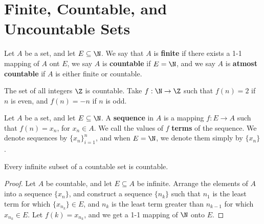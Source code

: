 
\section{Finite, Countable, and Uncountable Sets}

\begin{definition}
    Let $A$ be a set, and let  $E \subseteq \N$. We say that  $A$ is \textbf{finite} if there
    exists a 1-1 mapping of $A$ ont $E$, we say $A$ is \textbf{countable} if  $E=\N$, and
    we say  $A$ is \textbf{atmost countable} if $A$ is either finite or countable.
\end{definition}

\begin{example}
    The set of all integers $\Z$ is countable. Take  $f:\N \rightarrow \Z$ such that
    $f(n)=2$ if  $n$ is even, and  $f(n)=-n$ if  $n$ is odd.
\end{example}

\begin{definition}
    Let $A$ be a set, and let  $E \subseteq \N$. A \textbf{sequence} in  $A$ is a mapping
    $f:E \rightarrow A$ such that $f(n)=x_n$, for  $x_n \in A$. We call the values of  $f$
    \textbf{terms} of the sequence. We denote sequences by  $\{x_n\}_{i=1}^{n}$, and
    when  $E=\N$, we denote them simply by  $\{x_n\}$.
\end{definition}

\begin{theorem}\label{2.1.1}
    Every infinite subset of a countable set is countable.
\end{theorem}
\begin{proof}
    Let $A$ be countable, and let  $E \subseteq A$ be infinite. Arrange the elements of  $A$
    into a sequence $\{x_n\}$, and construct a sequence  $\{n_k\}$ such that  $n_1$ is the
    least term for which  $\{x_{n_k}\} \in E$, and  $n_k$ is the least term greater than
    $n_{k-1}$ for which  $x_{n_k} \in E$. Let $f(k)=x_{n_k}$, and we get a 1-1 mapping
    of $\N$ onto  $E$.
\end{proof}

